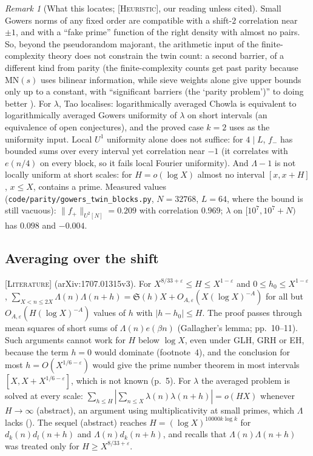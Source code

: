 \documentclass[11pt]{amsart}
\theoremstyle{definition}
\theoremstyle{remark}
\newtheorem{remark}[theorem]{Remark}
\newcommand{\lbl}[1]{\textup{\textsc{[#1]}}}
\begin{document}
\begin{remark}[What this locates; \lbl{Heuristic}, our reading unless cited]\label{rem:gowers}
Small Gowers norms of any fixed order are compatible with a shift-$2$
correlation near $\pm1$, and with a ``fake prime'' function of the right
density with almost no pairs. So, beyond the pseudorandom majorant, the
arithmetic input of the finite-complexity theory does not constrain the twin
count: a second barrier, of a different kind from parity (the
finite-complexity counts get past parity because MN$(s)$ uses bilinear
information, while sieve weights alone give upper bounds only up to a
constant, with ``significant barriers (the `parity problem')'' to doing better
\cite[pp.~9, 67--68]{GT10}). For $\lambda$, Tao localises: logarithmically
averaged Chowla is equivalent to logarithmically averaged Gowers uniformity of
$\lambda$ on short intervals \cite[Thm.~1.8, p.~5]{Tao16b} (an equivalence of
open conjectures), and the proved case $k=2$ \cite{Tao16} uses \cite{MRT15} as
the uniformity input. Local $U^1$ uniformity alone does not suffice: for $4\mid L$, $f_-$ has
bounded sums over every interval yet correlation near $-1$ (it correlates with
$e(n/4)$ on every block, so it fails local Fourier uniformity). And $\Lambda-1$ is
not locally uniform at short scales: for $H=o(\log X)$ almost no interval
$[x,x+H]$, $x\le X$, contains a prime. Measured values
(\texttt{code/}\allowbreak\texttt{parity/}\allowbreak\texttt{gowers\_twin\_blocks.py}, $N=32768$,
$L=64$, where the bound is still vacuous): $\|f_+\|_{U^2[N]}=0.209$ with
correlation $0.969$; $\lambda$ on $[10^7,10^7+N)$ has $0.098$ and $-0.004$.
\end{remark}

\subsection{Averaging over the shift}\label{subsec:mrt17}
\lbl{Literature} \cite[Theorem~1.3(i), footnote~4, pp.~4--11]{MRT17}
(arXiv:1707.01315v3). For $X^{8/33+\varepsilon}\le H\le X^{1-\varepsilon}$ and $0\le h_0\le
X^{1-\varepsilon}$, $\sum_{X<n\le2X}\Lambda(n)\Lambda(n+h)=\mathfrak S(h)X+O_{A,\varepsilon}(X(\log
X)^{-A})$ for all but $O_{A,\varepsilon}(H(\log X)^{-A})$ values of $h$ with
$|h-h_0|\le H$. The proof passes through mean squares of short sums of
$\Lambda(n)e(\beta n)$ (Gallagher's lemma; pp.~10--11). Such arguments cannot work
for $H$ below $\log X$, even under GLH, GRH or EH, because the term $h=0$ would
dominate (footnote~4), and the conclusion for most $h=O(X^{1/6-\varepsilon})$ would
give the prime number theorem in most intervals $[X,X+X^{1/6-\varepsilon}]$, which
is not known (p.~5). For $\lambda$ the averaged problem is solved at every scale:
$\sum_{h\le H}|\sum_{n\le X}\lambda(n)\lambda(n+h)|=o(HX)$ whenever $H\to\infty$
\cite{MRT15} (abstract), an argument using multiplicativity at small primes,
which $\Lambda$ lacks (\cite[footnote~4]{MRT17}). The sequel \cite{MRT17b}
(abstract) reaches $H=(\log X)^{10000k\log k}$ for $d_k(n)d_l(n+h)$ and
$\Lambda(n)d_k(n+h)$, and recalls that $\Lambda(n)\Lambda(n+h)$ was treated only for
$H\ge X^{8/33+\varepsilon}$.
\end{document}
